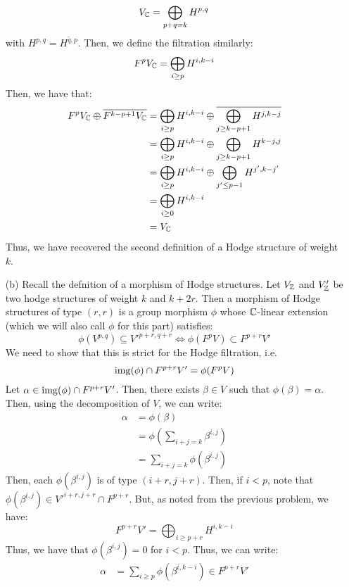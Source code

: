 \documentclass[12pt]{article}
\begin{document}
\begin{solution}
\begin{enumerate}
        \[ V_\mathbb C = \bigoplus_{p + q = k} H^{p, q}\]
        with $H^{p, q} = \overline{H^{q, p}}$. Then, we define the filtration similarly:
        \[ F^p V_\mathbb C = \bigoplus_{i \geq p} H^{i, k-i}\]
        Then, we have that: 
        \begin{align*}
            F^p V_\mathbb C \oplus \overline{F^{k-p+1} V_\mathbb C} &= \bigoplus_{i \geq p} H^{i, k-i} \oplus \overline{\bigoplus_{j \geq k-p+1} H^{j, k-j}} \\
            &= \bigoplus_{i \geq p} H^{i, k-i} \oplus \bigoplus_{j \geq k-p+1} H^{k-j, j} \\
            &= \bigoplus_{i \geq p} H^{i, k-i} \oplus \bigoplus_{j' \leq p-1} H^{j', k-j'} \\
            &= \bigoplus_{i \geq 0} H^{i, k-i}  \\
            &= V_\mathbb C
        \end{align*}
        Thus, we have recovered the second definition of a Hodge structure of weight $k$.
        \item[(b)] Recall the defnition of a morphism of Hodge structures. Let $V_\mathbb Z$ and $V'_\mathbb Z$ be two hodge structures of weight $k$ and $k+2r$. Then a morphism of Hodge structures of type $(r, r)$ is a group morphism $\phi$ whose $\mathbb C$-linear extension (which we will also call $\phi$ for this part) satisfies: 
        \[ \phi(V^{p,q}) \subseteq {V'}^{p+r, q+r} \iff \phi(F^p V) \subset F^{p+r} V'\]
        We need to show that this is strict for the Hodge filtration, i.e.
        \[ \operatorname{img}(\phi) \cap F^{p+r} V' = \phi(F^p V)\]
        Let $\alpha \in \operatorname{img}(\phi) \cap F^{p+r} V'$. Then, there exists $\beta \in V$ such that $\phi(\beta) = \alpha$. Then, using the decomposition of $V$, we can write: 
        \begin{align*}
            \alpha &= \phi(\beta) \\
            &= \phi\left(\sum_{i+j = k} \beta^{i,j}\right) \\
            &= \sum_{i+j = k} \phi(\beta^{i,j}) 
        \end{align*}
        Then, each $\phi(\beta^{i,j})$ is of type $(i+r, j+r)$. Then, if $i < p$, note that $\phi(\beta^{i, j}) \in {V'}^{i+r, j+r} \cap F^{p+r}$. But, as noted from the previous problem, we have:
        \[ F^{p+r} V' = \bigoplus_{i \geq p+r} H^{i, k-i} \]
        Thus, we have that $\phi(\beta^{i,j}) = 0$ for $i < p$. Thus, we can write:
        \begin{align*}
            \alpha &= \sum_{i \geq p} \phi(\beta^{i,k-i}) \in F^{p+r} V' 
        \end{align*}

\end{enumerate}
\end{solution}
\end{document}
